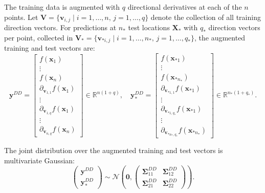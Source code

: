 \documentclass[12pt]{article}
\begin{document}
The training data is augmented with $q$ directional derivatives at each of the $n$ points. Let $\mathbf{V} = \{\mathbf{v}_{i,j} \mid i = 1,\ldots,n, \, j = 1,\ldots,q\}$ denote the collection of all training direction vectors. For predictions at $n_*$ test locations $\mathbf{X}_*$ with $q_*$ direction vectors per point, collected in $\mathbf{V}_* = \{\mathbf{v}_{*i,j} \mid i = 1,\ldots,n_*, \, j = 1,\ldots,q_*\}$, the augmented training and test vectors are:
\begin{equation}
	\label{eqn:ddgp_bg_aug_vector}
	\mathbf{y}^{DD} = \begin{bmatrix}
		f(\mathbf{x}_1) \\
		\vdots \\
		f(\mathbf{x}_n) \\
		\partial_{\mathbf{v}_{1,1}} f(\mathbf{x}_1) \\
		\vdots \\
		\partial_{\mathbf{v}_{1,q}} f(\mathbf{x}_1) \\
		\vdots \\
		\partial_{\mathbf{v}_{n,q}} f(\mathbf{x}_n)
	\end{bmatrix} \in \mathbb{R}^{n(1+q)}, \quad
	\mathbf{y}^{DD}_* = \begin{bmatrix}
		f(\mathbf{x}_{*1}) \\
		\vdots \\
		f(\mathbf{x}_{*n_*}) \\
		\partial_{\mathbf{v}_{*1,1}} f(\mathbf{x}_{*1}) \\
		\vdots \\
		\partial_{\mathbf{v}_{*1,q_*}} f(\mathbf{x}_{*1}) \\
		\vdots \\
		\partial_{\mathbf{v}_{*n_*,q_*}} f(\mathbf{x}_{*n_*})
	\end{bmatrix} \in \mathbb{R}^{n_*(1+q_*)}.
\end{equation}

The joint distribution over the augmented training and test vectors is multivariate Gaussian:
\begin{equation}
	\label{eqn:ddgp_bg_joint}
	\begin{pmatrix}
		\mathbf{y}^{DD} \\
		\mathbf{y}^{DD}_*
	\end{pmatrix}
	\sim \mathcal{N}\left(
	\mathbf{0},
	\begin{pmatrix}
		\boldsymbol{\Sigma}_{11}^{DD} & \boldsymbol{\Sigma}_{12}^{DD} \\
		\boldsymbol{\Sigma}_{21}^{DD} & \boldsymbol{\Sigma}_{22}^{DD}
	\end{pmatrix}
	\right).
\end{equation}
\end{document}
